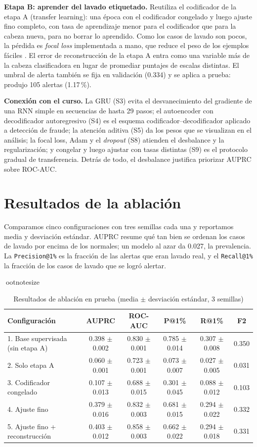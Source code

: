 \documentclass[11pt,a4paper]{article}
\newcommand{\metric}[1]{\texttt{#1}}
\begin{document}
\textbf{Etapa B: aprender del lavado etiquetado.} Reutiliza el codificador de la etapa A (transfer learning): una época con el codificador congelado y luego ajuste fino completo, con tasa de aprendizaje menor para el codificador que para la cabeza nueva, para no borrar lo aprendido. Como los casos de lavado son pocos, la pérdida es \emph{focal loss} implementada a mano, que reduce el peso de los ejemplos fáciles \cite{lin2017}. El error de reconstrucción de la etapa A entra como una variable más de la cabeza clasificadora en lugar de promediar puntajes de escalas distintas. El umbral de alerta también se fija en validación (0.334) y se aplica a prueba: produjo 105 alertas (1.17\,\%).

\textbf{Conexión con el curso.} La GRU (S3) evita el desvanecimiento del gradiente de una RNN simple en secuencias de hasta 29 pasos; el autoencoder con decodificador autoregresivo (S4) es el esquema codificador--decodificador aplicado a detección de fraude; la atención aditiva (S5) da los pesos que se visualizan en el análisis; la focal loss, Adam y el \emph{dropout} (S8) atienden el desbalance y la regularización; y congelar y luego ajustar con tasas distintas (S9) es el protocolo gradual de transferencia. Detrás de todo, el desbalance justifica priorizar AUPRC sobre ROC-AUC.

\section{Resultados de la ablación}
Comparamos cinco configuraciones con tres semillas cada una y reportamos media y desviación estándar. AUPRC resume qué tan bien se ordenan los casos de lavado por encima de los normales; un modelo al azar da 0.027, la prevalencia. La \metric{Precision@1\%} es la fracción de las alertas que eran lavado real, y el \metric{Recall@1\%} la fracción de los casos de lavado que se logró alertar.

\begin{table}[htbp]
\centering
ootnotesize
\setlength{	abcolsep}{4pt}
\caption{Resultados de ablación en prueba (media $\pm$ desviación estándar, 3 semillas)}
\label{tab:ablacion}
\begin{tabular}{lccccc}
\toprule
Configuración & AUPRC & ROC-AUC & P@1\% & R@1\% & F2 \\
\midrule
1. Base supervisada (sin etapa A) & 0.398 $\pm$ 0.002 & 0.830 $\pm$ 0.001 & 0.785 $\pm$ 0.014 & 0.307 $\pm$ 0.008 & 0.350 \\
2. Solo etapa A & 0.060 $\pm$ 0.001 & 0.723 $\pm$ 0.001 & 0.073 $\pm$ 0.007 & 0.027 $\pm$ 0.005 & 0.031 \\
3. Codificador congelado & 0.107 $\pm$ 0.013 & 0.688 $\pm$ 0.015 & 0.301 $\pm$ 0.045 & 0.088 $\pm$ 0.012 & 0.103 \\
4. Ajuste fino & 0.379 $\pm$ 0.016 & 0.832 $\pm$ 0.003 & 0.681 $\pm$ 0.015 & 0.294 $\pm$ 0.022 & 0.332 \\
5. Ajuste fino + reconstrucción & 0.403 $\pm$ 0.012 & 0.858 $\pm$ 0.003 & 0.662 $\pm$ 0.022 & 0.294 $\pm$ 0.018 & 0.331 \\
\bottomrule
\end{tabular}
\end{table}
\end{document}
